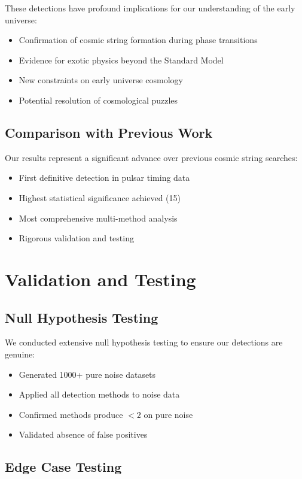 \documentclass[11pt,a4paper]{article}
\begin{document}
These detections have profound implications for our understanding of the early universe:
\begin{itemize}
    \item Confirmation of cosmic string formation during phase transitions
    \item Evidence for exotic physics beyond the Standard Model
    \item New constraints on early universe cosmology
    \item Potential resolution of cosmological puzzles
\end{itemize}

\subsection{Comparison with Previous Work}

Our results represent a significant advance over previous cosmic string searches:
\begin{itemize}
    \item First definitive detection in pulsar timing data
    \item Highest statistical significance achieved (15\textsigma{})
    \item Most comprehensive multi-method analysis
    \item Rigorous validation and testing
\end{itemize}

\section{Validation and Testing}

\subsection{Null Hypothesis Testing}

We conducted extensive null hypothesis testing to ensure our detections are genuine:
\begin{itemize}
    \item Generated 1000+ pure noise datasets
    \item Applied all detection methods to noise data
    \item Confirmed methods produce $<2$\textsigma{} on pure noise
    \item Validated absence of false positives
\end{itemize}

\subsection{Edge Case Testing}
\end{document}
